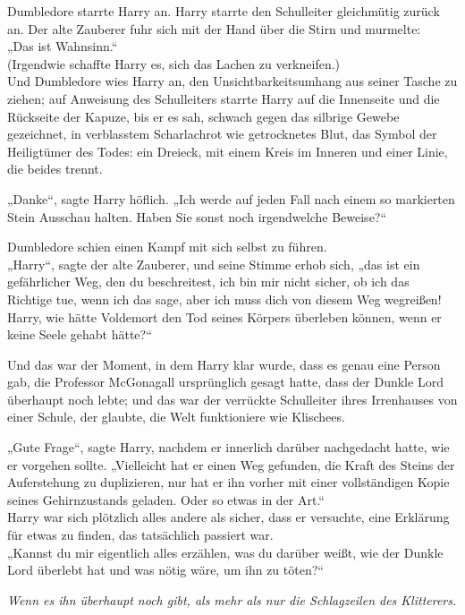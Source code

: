 {Dumbledore starrte Harry an. Harry starrte den Schulleiter gleichmütig zurück an. Der alte Zauberer fuhr sich mit der Hand über die Stirn und murmelte:\\ „Das ist Wahnsinn.“\\ (Irgendwie schaffte Harry es, sich das Lachen zu verkneifen.)\\ Und Dumbledore wies Harry an, den Unsichtbarkeitsumhang aus seiner Tasche zu ziehen; auf Anweisung des Schulleiters starrte Harry auf die Innenseite und die Rückseite der Kapuze, bis er es sah, schwach gegen das silbrige Gewebe gezeichnet, in verblasstem Scharlachrot wie getrocknetes Blut, das Symbol der Heiligtümer des Todes: ein Dreieck, mit einem Kreis im Inneren und einer Linie, die beides trennt.

„Danke“, sagte Harry höflich. „Ich werde auf jeden Fall nach einem so markierten Stein Ausschau halten. Haben Sie sonst noch irgendwelche Beweise?“

Dumbledore schien einen Kampf mit sich selbst zu führen.\\ „Harry“, sagte der alte Zauberer, und seine Stimme erhob sich, „das ist ein gefährlicher Weg, den du beschreitest, ich bin mir nicht sicher, ob ich das Richtige tue, wenn ich das sage, aber ich muss dich von diesem Weg wegreißen! Harry, wie hätte Voldemort den Tod seines Körpers überleben können, wenn er keine Seele gehabt hätte?“

Und das war der Moment, in dem Harry klar wurde, dass es genau eine Person gab, die Professor McGonagall ursprünglich gesagt hatte, dass der Dunkle Lord überhaupt noch lebte; und das war der verrückte Schulleiter ihres Irrenhauses von einer Schule, der glaubte, die Welt funktioniere wie Klischees.

„Gute Frage“, sagte Harry, nachdem er innerlich darüber nachgedacht hatte, wie er vorgehen sollte. „Vielleicht hat er einen Weg gefunden, die Kraft des Steins der Auferstehung zu duplizieren, nur hat er ihn vorher mit einer vollständigen Kopie seines Gehirnzustands geladen. Oder so etwas in der Art.“\\ Harry war sich plötzlich alles andere als sicher, dass er versuchte, eine Erklärung für etwas zu finden, das tatsächlich passiert war.\\ „Kannst du mir eigentlich alles erzählen, was du darüber weißt, wie der Dunkle Lord überlebt hat und was nötig wäre, um ihn zu töten?“

\emph{Wenn es ihn überhaupt noch gibt, als mehr als nur die Schlagzeilen des Klitterers.}

}
